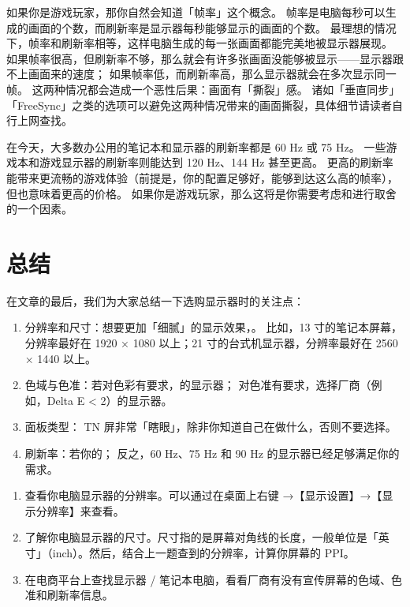 如果你是游戏玩家，那你自然会知道「帧率」这个概念。
帧率是电脑每秒可以生成的画面的个数，而刷新率是显示器每秒能够显示的画面的个数。
最理想的情况下，帧率和刷新率相等，这样电脑生成的每一张画面都能完美地被显示器展现。
如果帧率很高，但刷新率不够，那么就会有许多张画面没能够被显示——显示器跟不上画面来的速度；
如果帧率低，而刷新率高，那么显示器就会在多次显示同一帧。
这两种情况都会造成一个恶性后果：画面有「撕裂」感。
诸如「垂直同步」「FreeSync」之类的选项可以避免这两种情况带来的画面撕裂，具体细节请读者自行上网查找。

在今天，大多数办公用的笔记本和显示器的刷新率都是 60 Hz 或 75 Hz。
一些游戏本和游戏显示器的刷新率则能达到 120 Hz、144 Hz 甚至更高。
更高的刷新率能带来更流畅的游戏体验（前提是，你的配置足够好，能够到达这么高的帧率），但也意味着更高的价格。
如果你是游戏玩家，那么这将是你需要考虑和进行取舍的一个因素。

\section{总结}

在文章的最后，我们为大家总结一下选购显示器时的关注点：

\begin{enumerate}
  \item 分辨率和尺寸：想要更加「细腻」的显示效果，。
    比如，13 寸的笔记本屏幕，分辨率最好在 1920 × 1080 以上；21 寸的台式机显示器，分辨率最好在 2560 × 1440 以上。
  \item 色域与色准：若对色彩有要求，的显示器；
    对色准有要求，选择厂商（例如，Delta E < 2）的显示器。
  \item 面板类型：
    TN 屏非常「瞎眼」，除非你知道自己在做什么，否则不要选择。
  \item 刷新率：若你的；
    反之，60 Hz、75 Hz 和 90 Hz 的显示器已经足够满足你的需求。
\end{enumerate}

\practice

\begin{enumerate}
  \item 查看你电脑显示器的分辨率。可以通过在桌面上右键 →【显示设置】→【显示分辨率】来查看。
  \item 了解你电脑显示器的尺寸。尺寸指的是屏幕对角线的长度，一般单位是「英寸」（inch）。然后，结合上一题查到的分辨率，计算你屏幕的 PPI。
  \item 在电商平台上查找显示器 / 笔记本电脑，看看厂商有没有宣传屏幕的色域、色准和刷新率信息。
\end{enumerate}